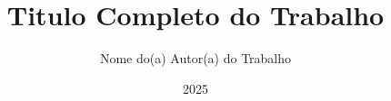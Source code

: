 \makeatletter
\newcommand{\cidade}[1]{\gdef\@cidade{#1}}
\newcommand{\faculdade}[1]{\gdef\@faculdade{#1}}
\newcommand{\faculdadesigla}[1]{\gdef\@faculdadesigla{#1}}
\newcommand{\instcomp}[1]{\gdef\@instcomp{#1}}
\newcommand{\instnce}[1]{\gdef\@instnce{#1}}
\newcommand{\instncecurto}[1]{\gdef\@instncecurto{#1}}
\newcommand{\programa}[1]{\gdef\@programa{#1}}
\newcommand{\progsigla}[1]{\gdef\@progsigla{#1}}
\newcommand{\orientadora}[1]{\gdef\@orientadora{#1}}
\newcommand{\coorientadora}[1]{\gdef\@coorientadora{#1}}
\newcommand{\orientadorastitulo}[1]{\gdef\@orientadorastitulo{#1}}
\newcommand{\textofolharosto}[1]{\gdef\@textofolharosto{#1}}


\title{Titulo Completo do Trabalho}
\author{Nome do(a) Autor(a) do Trabalho}
\date{2025}
\cidade{Rio de Janeiro}
\faculdade{Universidade Federal do Rio de Janeiro}
\faculdadesigla{UFRJ}
\instcomp{Instituto de Computação}
\instnce{Instituto Tércio Pacitti de Aplicações e Pesquisas Computacionais}
\instncecurto{Instituto Tércio Pacitti de Aplicações}
\programa{Programa de Pós-Graduação em Informática}
\progsigla{PPGI}
\orientadora{Nome do(a) Orientador(a)}
\coorientadora{Nome do(a) Co-orientador(a)}
\orientadorastitulo{D.SC}
\textofolharosto{Dissertação de Mestrado apresentada ao \@programa, \@instcomp\ e  \@instnce, \@faculdade, como requisito parcial à obtenção do título de Mestre em Informática.}
\makeatother